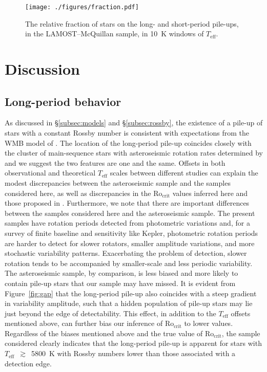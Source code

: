\documentclass[linenumbers,tighten,trackchanges,twocolumn]{aastex631}
\newcommand{\rocrit}{$\mathrm{Ro_{crit}}$\xspace}
\newcommand{\lamostmcq}{LAMOST--McQuillan\xspace}
\newcommand{\teffmin}{5800~K\xspace}
\newcommand{\teff}{\ensuremath{T_{\mathrm{eff}}}\xspace}
\begin{document}
\begin{figure}
    \centering
    \texttt{[image: ./figures/fraction.pdf]}
    \caption{The relative fraction of stars on the long- and short-period pile-ups, in the \lamostmcq sample, in 10~K windows of \teff.}
    \label{fig:fraction}
\end{figure}


\section{Discussion} \label{sec:discussion}

\subsection{Long-period behavior} \label{subsec:longperiod}

As discussed in \S\ref{subsec:models} and \S\ref{subsec:rossby}, the existence of a pile-up of stars with a constant Rossby number is consistent with expectations from the WMB model of \citet{vanSaders2016, vanSaders2019}. The location of the long-period pile-up coincides closely with the cluster of main-sequence stars with asteroseismic rotation rates determined by \citet{Hall2021} and we suggest the two features are one and the same. Offsets in both observational and theoretical \teff scales between different studies can explain the modest discrepancies between the asteroseismic sample and the samples considered here, as well as discrepancies in the \rocrit values inferred here and those proposed in \citet{vanSaders2019}. {\color{red} Furthermore, we note that there are important differences between the samples considered here and the \citet{Hall2021} asteroseismic sample. The present samples have rotation periods detected from photometric variations and, for a survey of finite baseline and sensitivity like Kepler, photometric rotation periods are harder to detect for slower rotators, smaller amplitude variations, and more stochastic variability patterns. Exacerbating the problem of detection, slower rotation tends to be accompanied by smaller-scale and less periodic variability. The asteroseismic sample, by comparison, is less biased and more likely to contain pile-up stars that our sample may have missed. It is evident from Figure~\ref{fig:gap} that the long-period pile-up also coincides with a steep gradient in variability amplitude, such that a hidden population of pile-up stars may lie just beyond the edge of detectability. This effect, in addition to the \teff offsets mentioned above, can further bias our inference of \rocrit to lower values. Regardless of the biases mentioned above and the true value of \rocrit, the sample considered clearly indicates that the long-period pile-up is apparent for stars with \teff~$\gtrsim$~\teffmin with Rossby numbers lower than those associated with a detection edge.}
\end{document}
